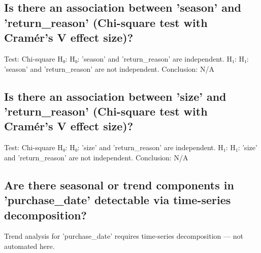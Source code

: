 \documentclass{article}%
\begin{document}
%
\subsection{Is there an association between 'season' and 'return\_reason' (Chi{-}square test with Cramér’s V effect size)?}%
\label{subsec:Isthereanassociationbetweenseasonandreturnreason(Chi{-}squaretestwithCramrsVeffectsize)?}%
Test: Chi{-}square\newline%
H₀: H₀: 'season' and 'return\_reason' are independent.\newline%
H₁: H₁: 'season' and 'return\_reason' are not independent.\newline%
Conclusion: N/A

%
\subsection{Is there an association between 'size' and 'return\_reason' (Chi{-}square test with Cramér’s V effect size)?}%
\label{subsec:Isthereanassociationbetweensizeandreturnreason(Chi{-}squaretestwithCramrsVeffectsize)?}%
Test: Chi{-}square\newline%
H₀: H₀: 'size' and 'return\_reason' are independent.\newline%
H₁: H₁: 'size' and 'return\_reason' are not independent.\newline%
Conclusion: N/A

%
\subsection{Are there seasonal or trend components in 'purchase\_date' detectable via time{-}series decomposition?}%
\label{subsec:Arethereseasonalortrendcomponentsinpurchasedatedetectableviatime{-}seriesdecomposition?}%
Trend analysis for 'purchase\_date' requires time{-}series decomposition — not automated here.

%
\end{document}
